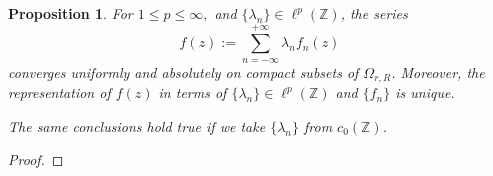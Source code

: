\documentclass[12pt, reqno]{amsart}
\newtheorem{proposition}[theorem]{Proposition}
\theoremstyle{definition}
\theoremstyle{remark}
\numberwithin{equation}{section}
\begin{document}
\begin{proposition} \label{Annuli}
    For $1\leq p\leq \infty,$ and $\{\lambda_n\}\in \ell^p(\mathbb{Z})$, the series 
    \begin{equation}\label{Laurent}
        f(z):=\sum_{n=-\infty}^{+\infty}\lambda_{n}f_{n} (z)
    \end{equation}
    converges uniformly and absolutely on compact subsets of $\Omega_{r,R}$. Moreover, the representation of $f(z)$ in terms of $\{\lambda_n\}\in \ell^p(\mathbb{Z})$ and $\{f_n\}$ is unique.
    
    The same conclusions hold true if we take $\{\lambda_n\}$ from $c_0(\mathbb{Z})$.

    
\end{proposition}
\begin{proof} 





\end{proof}
\end{document}
